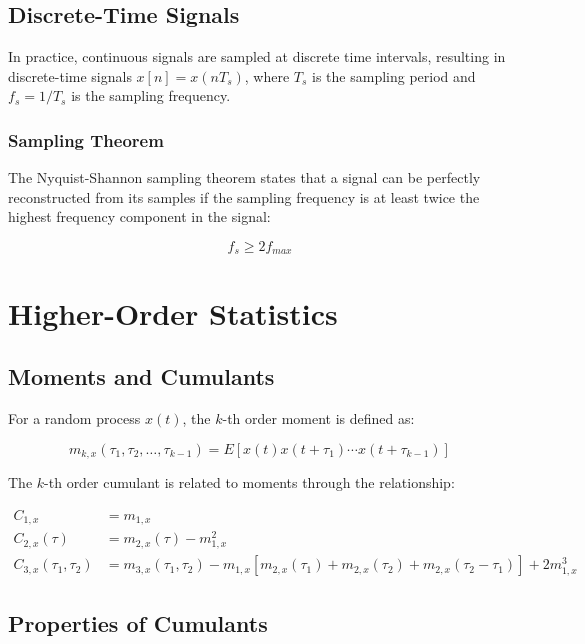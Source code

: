 \subsection{Discrete-Time Signals}

In practice, continuous signals are sampled at discrete time intervals, resulting in discrete-time signals $x[n] = x(nT_s)$, where $T_s$ is the sampling period and $f_s = 1/T_s$ is the sampling frequency.

\subsubsection{Sampling Theorem}

The Nyquist-Shannon sampling theorem states that a signal can be perfectly reconstructed from its samples if the sampling frequency is at least twice the highest frequency component in the signal:

\begin{equation}
f_s \geq 2f_{max}
\end{equation}

\section{Higher-Order Statistics}

\subsection{Moments and Cumulants}

For a random process $x(t)$, the $k$-th order moment is defined as:

\begin{equation}
m_{k,x}(\tau_1, \tau_2, \ldots, \tau_{k-1}) = E[x(t)x(t+\tau_1) \cdots x(t+\tau_{k-1})]
\end{equation}

The $k$-th order cumulant is related to moments through the relationship:

\begin{align}
C_{1,x} &= m_{1,x} \\
C_{2,x}(\tau) &= m_{2,x}(\tau) - m_{1,x}^2 \\
C_{3,x}(\tau_1, \tau_2) &= m_{3,x}(\tau_1, \tau_2) - m_{1,x}[m_{2,x}(\tau_1) + m_{2,x}(\tau_2) + m_{2,x}(\tau_2-\tau_1)] + 2m_{1,x}^3
\end{align}

\subsection{Properties of Cumulants}

